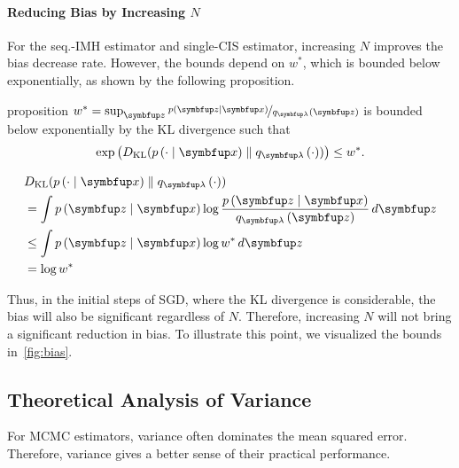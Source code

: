 \paragraph{Reducing Bias by Increasing \(N\)}
For the seq.-IMH estimator and single-CIS estimator, increasing \(N\) improves the bias decrease rate.
However, the bounds depend on \(w^*\), which is bounded below exponentially, as shown by the following proposition.
%
\begin{theoremEnd}{proposition}\label{thm:kl_bound}
  \(w^* = \sup_{\vz} \nicefrac{p\left(\vz\mid\vx\right)}{q_{\vlambda}\left(\vz\right)} \) is bounded below exponentially by the KL divergence such that
  \[
  \exp\left(\DKL{p\left(\cdot\mid\vx\right)}{ q_{\vlambda}\left(\cdot\right) }\right) \leq w^*.
  \]
\end{theoremEnd}
\begin{proofEnd}
  \begin{align}
    &\DKL{p\left(\cdot\mid\vx\right)}{ q_{\vlambda}\left(\cdot\right) } \\
    &= \int p\left(\vz\mid\vx\right) \log \frac{p\left(\vz\mid\vx\right)}{q_{\vlambda}\left(\vz\right)}\,d\vz \\
    &\leq \int p\left(\vz\mid\vx\right) \log w^* \, d\vz \\
    &= \log w^*
  \end{align}
\end{proofEnd}

Thus, in the initial steps of SGD, where the KL divergence is considerable, the bias will also be significant regardless of \(N\).
Therefore, increasing \(N\) will not bring a significant reduction in bias.
To illustrate this point, we visualized the bounds in~\cref{fig:bias}.

\vspace{-0.05in}
\subsection{Theoretical Analysis of Variance}
For MCMC estimators, variance often dominates the mean squared error.
Therefore, variance gives a better sense of their practical performance.

\vspace{-0.05in}
